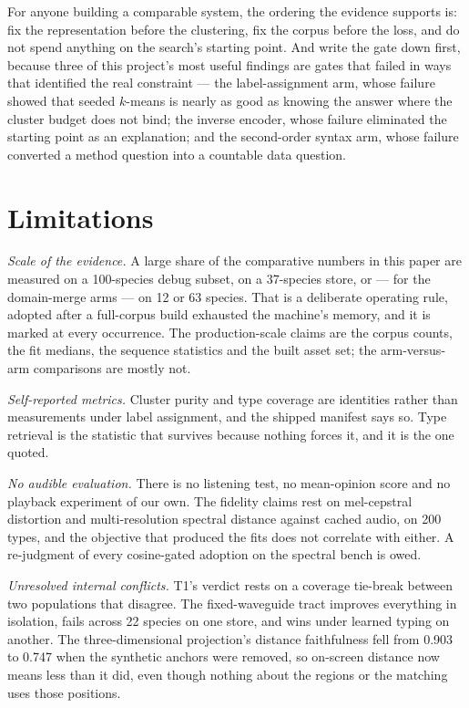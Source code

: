 \documentclass[10pt,twocolumn,a4paper]{article}
\begin{document}
For anyone building a comparable system, the ordering the evidence supports is: fix the
representation before the clustering, fix the corpus before the loss, and do not spend
anything on the search's starting point. And write the gate down first, because three of this
project's most useful findings are gates that failed in ways that identified the real
constraint --- the label-assignment arm, whose failure showed that seeded $k$-means is nearly
as good as knowing the answer where the cluster budget does not bind; the inverse encoder,
whose failure eliminated the starting point as an explanation; and the second-order syntax
arm, whose failure converted a method question into a countable data question.

\section{Limitations}
\label{sec:limitations}

\emph{Scale of the evidence.} A large share of the comparative numbers in this paper are
measured on a 100-species debug subset, on a 37-species store, or --- for the domain-merge
arms --- on 12 or 63 species. That is a deliberate operating rule, adopted after a
full-corpus build exhausted the machine's memory, and it is marked at every occurrence. The
production-scale claims are the corpus counts, the fit medians, the sequence statistics and
the built asset set; the arm-versus-arm comparisons are mostly not.

\emph{Self-reported metrics.} Cluster purity and type coverage are identities rather than
measurements under label assignment, and the shipped manifest says so. Type retrieval is the
statistic that survives because nothing forces it, and it is the one quoted.

\emph{No audible evaluation.} There is no listening test, no mean-opinion score and no
playback experiment of our own. The fidelity claims rest on mel-cepstral distortion and
multi-resolution spectral distance against cached audio, on 200 types, and the objective that
produced the fits does not correlate with either. A re-judgment of every cosine-gated
adoption on the spectral bench is owed.

\emph{Unresolved internal conflicts.} T1's verdict rests on a coverage tie-break between two
populations that disagree. The fixed-waveguide tract improves everything in isolation, fails
across 22 species on one store, and wins under learned typing on another. The three-dimensional
projection's distance faithfulness fell from 0.903 to 0.747 when the synthetic anchors were
removed, so on-screen distance now means less than it did, even though nothing about the
regions or the matching uses those positions.
\end{document}
